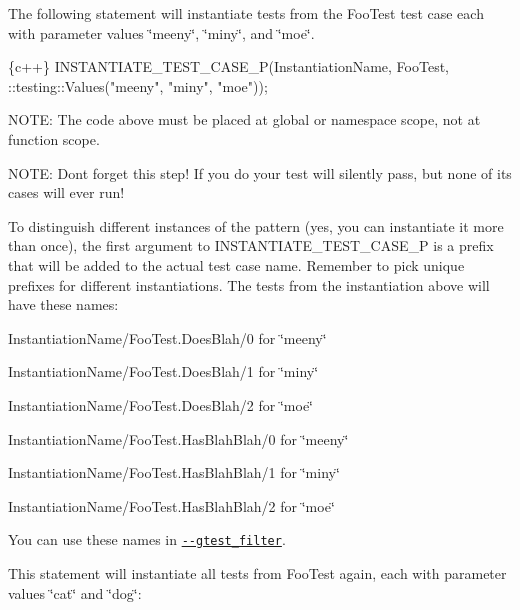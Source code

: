 The following statement will instantiate tests from the {\ttfamily Foo\+Test} test case each with parameter values {\ttfamily \char`\"{}meeny\char`\"{}}, {\ttfamily \char`\"{}miny\char`\"{}}, and {\ttfamily \char`\"{}moe\char`\"{}}.


\begin{DoxyCode}
\{c++\}
INSTANTIATE\_TEST\_CASE\_P(InstantiationName,
                        FooTest,
                        ::testing::Values("meeny", "miny", "moe"));
\end{DoxyCode}


N\+O\+TE\+: The code above must be placed at global or namespace scope, not at function scope.

N\+O\+TE\+: Don\textquotesingle{}t forget this step! If you do your test will silently pass, but none of its cases will ever run!

To distinguish different instances of the pattern (yes, you can instantiate it more than once), the first argument to {\ttfamily I\+N\+S\+T\+A\+N\+T\+I\+A\+T\+E\+\_\+\+T\+E\+S\+T\+\_\+\+C\+A\+S\+E\+\_\+P} is a prefix that will be added to the actual test case name. Remember to pick unique prefixes for different instantiations. The tests from the instantiation above will have these names\+:


\begin{DoxyItemize}
\item {\ttfamily Instantiation\+Name/\+Foo\+Test.\+Does\+Blah/0} for {\ttfamily \char`\"{}meeny\char`\"{}}
\item {\ttfamily Instantiation\+Name/\+Foo\+Test.\+Does\+Blah/1} for {\ttfamily \char`\"{}miny\char`\"{}}
\item {\ttfamily Instantiation\+Name/\+Foo\+Test.\+Does\+Blah/2} for {\ttfamily \char`\"{}moe\char`\"{}}
\item {\ttfamily Instantiation\+Name/\+Foo\+Test.\+Has\+Blah\+Blah/0} for {\ttfamily \char`\"{}meeny\char`\"{}}
\item {\ttfamily Instantiation\+Name/\+Foo\+Test.\+Has\+Blah\+Blah/1} for {\ttfamily \char`\"{}miny\char`\"{}}
\item {\ttfamily Instantiation\+Name/\+Foo\+Test.\+Has\+Blah\+Blah/2} for {\ttfamily \char`\"{}moe\char`\"{}}
\end{DoxyItemize}

You can use these names in \href{#running-a-subset-of-the-tests}{\tt {\ttfamily -\/-\/gtest\+\_\+filter}}.

This statement will instantiate all tests from {\ttfamily Foo\+Test} again, each with parameter values {\ttfamily \char`\"{}cat\char`\"{}} and {\ttfamily \char`\"{}dog\char`\"{}}\+:


